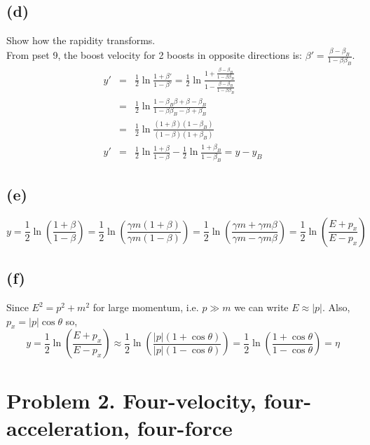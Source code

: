 \documentclass[11pt]{amsart}
\begin{document}
\subsection*{(d)} Show how the rapidity transforms. \\
From pset 9, the boost velocity for 2 boosts in opposite directions is: $\beta'=\frac{\beta-\beta_{B}}{1-\beta\beta_{B}}$. \\
\begin{eqnarray*} 
y' &=& \frac{1}{2}\ln{\frac{1+\beta'}{1-\beta'}} = \frac{1}{2}\ln{\frac{1+\frac{\beta-\beta_{B}}{1-\beta\beta_{B}}}{1-\frac{\beta-\beta_{B}}{1-\beta\beta_{B}}}} \\
&=& \frac{1}{2}\ln{\frac{1-\beta_{B}\beta+\beta-\beta_{B}}{1-\beta\beta_{B}-\beta+\beta_{B}}} \\
&=& \frac{1}{2}\ln{\frac{(1+\beta)(1-\beta_{B})}{(1-\beta)(1+\beta_{B})}} \\
y' &=& \frac{1}{2}\ln{\frac{1+\beta}{1-\beta}}-\frac{1}{2}\ln{\frac{1+\beta_{B}}{1-\beta_{B}}} = y-y_{B} 
\end{eqnarray*} 
\subsection*{(e)}
\[y = \frac{1}{2} \ln{\left(\frac{1 + \beta}{1 - \beta}\right)} = \frac{1}{2} \ln{\left(\frac{\gamma m(1 + \beta)}{\gamma m(1 - \beta)}\right)} =  \frac{1}{2} \ln{\left(\frac{\gamma m + \gamma m \beta}{\gamma m  - \gamma m \beta}\right)} = \frac{1}{2} \ln{\left(\frac{E + p_x}{E - p_x}\right)}  \]

\subsection*{(f)}

Since $E^2 = p^2 + m^2$ for large momentum, i.e. $p \gg m$ we can write $E \approx |p|$. Also, $p_x = |p| \cos{\theta}$ so, 
\[ y = \frac{1}{2} \ln{\left(\frac{E + p_x}{E - p_x}\right)} \approx \frac{1}{2} \ln{\left(\frac{|p| (1 + \cos{\theta})}{|p|(1 - \cos{\theta})}\right)} = \frac{1}{2} \ln{\left(\frac{1 + \cos{\theta}}{1- \cos{\theta}}\right)} = \eta  \] 

\section*{Problem 2. Four-velocity, four-acceleration, four-force}
\end{document}
